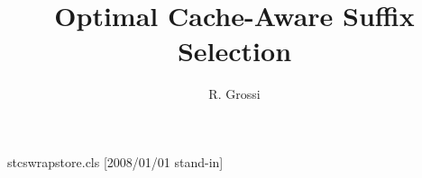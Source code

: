 \begin{filecontents*}{stcswrapstore.cls}
[2008/01/01 stand-in]
\let\st@address\address
\def\st@pending{}
\renewcommand{\address}[2][]{\g@addto@macro\st@pending{\st@address[#1]{#2}}}
\def\@setaddresses{\par\begingroup\def\address##1##2{##2\par}%
  \def\curraddr##1##2{Current address: ##2\par}\def\email##1##2{E-mail address: ##2\par}%
  \def\urladdr##1##2{URL: ##2\par}\addresses\endgroup}
\def\@maketitle{\@settitle\ifx\@empty\authors\else\@setauthors\fi\begingroup\def\st@address[##1]##2{##2\par}\par\st@pending\endgroup\@setaddresses}
\def\enddoc@text{}
\end{filecontents*}
\documentclass{stcswrapstore}

\title{Optimal Cache-Aware Suffix Selection}
\author{R. Grossi}
\address{Dipartimento di Informatica, Universita di Pisa}
\maketitle
Body.

